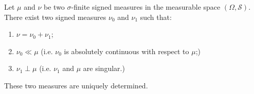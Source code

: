\documentclass[12pt]{article}
\begin{document}
Let $\mu$ and $\nu$ be two $\sigma$-finite signed measures in the measurable space $(\Omega,\mathscr{S})$. There exist two  signed measures $\nu_0$ and $\nu_1$ such that:
\begin{enumerate}
\item $\nu=\nu_0+\nu_1$;
\item $\nu_0\ll\mu$ (i.e. $\nu_0$ is absolutely continuous with respect to $\mu$;)
\item $\nu_1\perp\mu$ (i.e. $\nu_1$ and $\mu$ are singular.)
\end{enumerate}
These two measures are uniquely determined.
\end{document}
